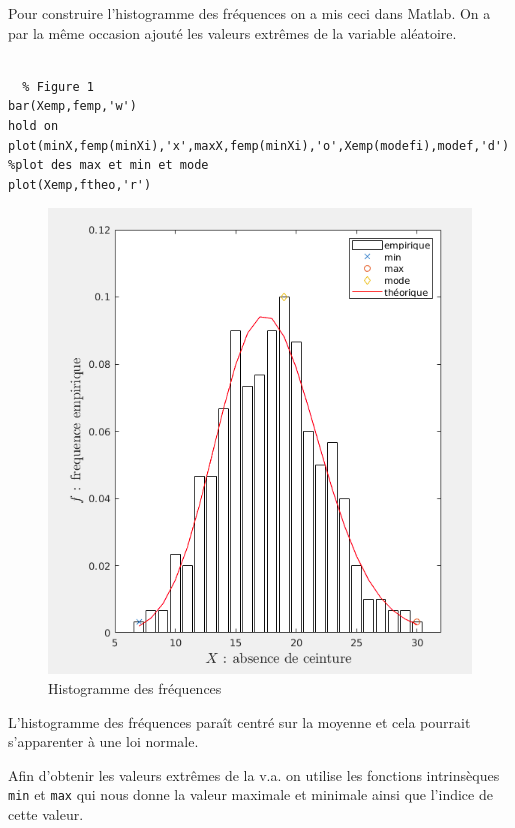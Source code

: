 \documentclass[a4paper,oneside]{article}
\makeatletter
\def\bigcenter{\trivlist \bigcentering\item\relax}
\def\bigcentering{\let\\\@centercr\rightskip\@bigflushglue%
\leftskip\@bigflushglue
\parindent\z@\parfillskip\z@skip}
\makeatother
\begin{document}
\begin{enumerate}
  \item

  Pour construire l'histogramme des fréquences on a mis ceci dans Matlab.
  On a par la même occasion ajouté les valeurs extrêmes de la variable aléatoire.

\begin{lstlisting}

  % Figure 1
bar(Xemp,femp,'w')
hold on
plot(minX,femp(minXi),'x',maxX,femp(minXi),'o',Xemp(modefi),modef,'d') %plot des max et min et mode
plot(Xemp,ftheo,'r')

\end{lstlisting}


  \begin{figure}[h!]
  \bigcenter
  \includegraphics[scale=0.8]{fig_1_sub1.png}
  \caption{Histogramme des fréquences}
  \end{figure}


L'histogramme des fréquences paraît centré sur la moyenne et cela pourrait s'apparenter à une loi normale.

\clearpage

\item Afin d'obtenir les valeurs extrêmes de la v.a. on utilise les fonctions intrinsèques \verb?min? et \verb?max? qui nous donne la valeur maximale et minimale ainsi que l'indice de cette valeur.


\end{enumerate}
\end{document}
